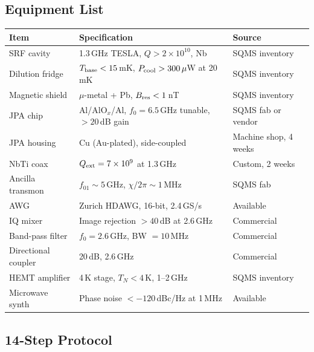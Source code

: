 \documentclass[11pt]{article}
\theoremstyle{definition}
\theoremstyle{remark}
\newcommand{\ee}[1]{\times 10^{#1}}
\begin{document}
\subsection{Equipment List}

\begin{center}
\begin{longtable}{@{}p{3.5cm}p{4.5cm}p{4cm}@{}}
\toprule
Item & Specification & Source \\
\midrule
\endfirsthead
\midrule
\endhead
SRF cavity & 1.3\,GHz TESLA, $Q > 2\ee{10}$, Nb & SQMS inventory \\
Dilution fridge & $T_{\rm base} < 15$\,mK, $P_{\rm cool} > 300\,\mu$W at 20\,mK & SQMS inventory \\
Magnetic shield & $\mu$-metal + Pb, $B_{\rm res} < 1$\,nT & SQMS inventory \\
JPA chip & Al/AlO$_x$/Al, $f_0 = 6.5$\,GHz tunable, $> 20$\,dB gain & SQMS fab or vendor \\
JPA housing & Cu (Au-plated), side-coupled & Machine shop, 4 weeks \\
NbTi coax & $Q_{\rm ext} = 7\ee{9}$ at 1.3\,GHz & Custom, 2 weeks \\
Ancilla transmon & $f_{01} \sim 5$\,GHz, $\chi/2\pi \sim 1$\,MHz & SQMS fab \\
AWG & Zurich HDAWG, 16-bit, 2.4\,GS/s & Available \\
IQ mixer & Image rejection $> 40$\,dB at 2.6\,GHz & Commercial \\
Band-pass filter & $f_0 = 2.6$\,GHz, BW $= 10$\,MHz & Commercial \\
Directional coupler & 20\,dB, 2.6\,GHz & Commercial \\
HEMT amplifier & 4\,K stage, $T_N < 4$\,K, 1--2\,GHz & SQMS inventory \\
Microwave synth & Phase noise $< -120$\,dBc/Hz at 1\,MHz & Available \\
\bottomrule
\end{longtable}
\end{center}

\subsection{14-Step Protocol}
\end{document}
